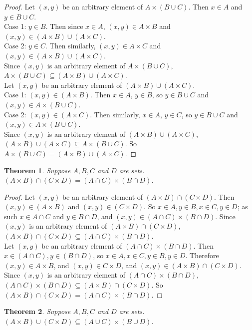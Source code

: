 \documentclass{report}
\newtheorem*{theorem}{Theorem}
\theoremstyle{definition}
\begin{document}
\begin{proof}
Let $(x,y)$ be an arbitrary element of $A\times(B\cup C)$. Then $x\in A$ and $y\in B\cup C$.\\
Case 1: $y\in B$. Then since $x\in A$, $(x,y)\in A\times B$ and $(x,y)\in(A\times B)\cup(A\times C)$.\\
Case 2: $y\in C$. Then similarly, $(x,y)\in A\times C$ and $(x,y)\in(A\times B)\cup(A\times C)$.\\
Since $(x,y)$ is an arbitrary element of $A\times (B\cup C)$, $A\times(B\cup C)\subseteq(A\times B)\cup(A\times C)$.\\
\indent Let $(x,y)$ be an arbitrary element of $(A\times B)\cup(A\times C)$.\\
Case 1: $(x,y)\in(A\times B)$. Then $x\in A$, $y\in B$, so $y\in B\cup C$ and $(x,y)\in A\times(B\cup C)$.\\
Case 2: $(x,y)\in(A\times C)$. Then similarly, $x\in A$, $y\in C$, so $y\in B\cup C$ and $(x,y)\in A\times(B\cup C)$.\\
Since $(x,y)$ is an arbitrary element of $(A\times B)\cup(A\times C)$, $(A\times B)\cup(A\times C)\subseteq A\times(B\cup C)$. So $A\times(B\cup C)=(A\times B)\cup(A\times C)$.
\end{proof}
\begin{theorem}
Suppose $A,B,C$ and $D$ are sets. $(A\times B)\cap(C\times D)=(A\cap C)\times(B\cap D)$.
\end{theorem}
\begin{proof}
Let $(x,y)$ be an arbitrary element of $(A\times B)\cap(C\times D)$. Then $(x,y)\in(A\times B)$ and $(x,y)\in(C\times D)$. So $x\in A,y\in B,x\in C,y\in D$; 
as such $x\in A\cap C$ and $y\in B\cap D$, and $(x,y)\in(A\cap C)\times(B\cap D)$. Since $(x,y)$ is an arbitrary element of $(A\times B)\cap(C\times D)$, 
$(A\times B)\cap(C\times D)\subseteq(A\cap C)\times(B\cap D)$.\\
\indent Let $(x,y)$ be an arbitrary element of $(A\cap C)\times(B\cap D)$. Then $x\in(A\cap C),y\in(B\cap D)$, so $x\in A,x\in C,y\in B,y\in D$. 
Therefore $(x,y)\in A\times B$, and $(x,y)\in C\times D$, and $(x,y)\in(A\times B)\cap(C\times D)$. Since $(x,y)$ is an arbitrary element of $(A\cap C)\times(B\cap D)$, 
$(A\cap C)\times(B\cap D)\subseteq(A\times B)\cap(C\times D)$. So $(A\times B)\cap(C\times D)=(A\cap C)\times(B\cap D)$.
\end{proof}
\begin{theorem}
Suppose $A,B,C$ and $D$ are sets. $(A\times B)\cup(C\times D)\subseteq(A\cup C)\times(B\cup D)$.
\end{theorem}
\end{document}
